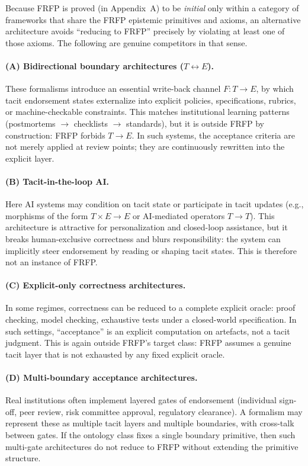 Because FRFP is proved (in Appendix~A) to be \emph{initial} only within a category of frameworks that
share the FRFP epistemic primitives and axioms, an alternative architecture avoids ``reducing to
FRFP'' precisely by violating at least one of those axioms. The following are genuine competitors in
that sense.

\paragraph{(A) Bidirectional boundary architectures (\(T\leftrightarrow E\)).}
These formalisms introduce an essential write-back channel \(F:T\to E\), by which tacit endorsement
states externalize into explicit policies, specifications, rubrics, or machine-checkable constraints.
This matches institutional learning patterns (postmortems \(\to\) checklists \(\to\) standards), but it
is outside FRFP by construction: FRFP forbids \(T\to E\). In such systems, the acceptance criteria are
not merely applied at review points; they are continuously rewritten into the explicit layer.

\paragraph{(B) Tacit-in-the-loop AI.}
Here AI systems may condition on tacit state or participate in tacit updates (e.g., morphisms of the
form \(T\times E\to E\) or AI-mediated operators \(T\to T\)). This architecture is attractive for
personalization and closed-loop assistance, but it breaks human-exclusive correctness and blurs
responsibility: the system can implicitly steer endorsement by reading or shaping tacit states. This
is therefore not an instance of FRFP.

\paragraph{(C) Explicit-only correctness architectures.}
In some regimes, correctness can be reduced to a complete explicit oracle: proof checking, model
checking, exhaustive tests under a closed-world specification. In such settings, ``acceptance'' is an
explicit computation on artefacts, not a tacit judgment. This is again outside FRFP's target class:
FRFP assumes a genuine tacit layer that is not exhausted by any fixed explicit oracle.

\paragraph{(D) Multi-boundary acceptance architectures.}
Real institutions often implement layered gates of endorsement (individual sign-off, peer review,
risk committee approval, regulatory clearance). A formalism may represent these as multiple tacit
layers and multiple boundaries, with cross-talk between gates. If the ontology class fixes a single
boundary primitive, then such multi-gate architectures do not reduce to FRFP without extending the
primitive structure.

